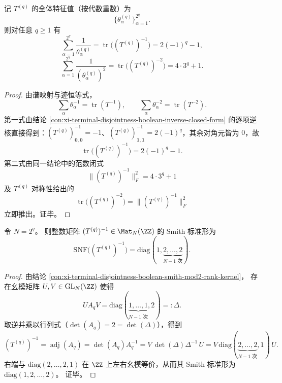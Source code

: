 \begin{conclusion}[全谱倒一阶与倒二阶矩闭式]\label{con:xi-terminal-disjointness-boolean-inverse-spectral-moments}
记 \(T^{(q)}\) 的全体特征值（按代数重数）为
\[
\{\theta_{\alpha}^{(q)}\}_{\alpha=1}^{2^q}.
\]
则对任意 \(q\ge 1\) 有
\[
\sum_{\alpha=1}^{2^q}\frac{1}{\theta_{\alpha}^{(q)}}
=\operatorname{tr}\!\bigl((T^{(q)})^{-1}\bigr)
=2(-1)^q-1,
\]
\[
\sum_{\alpha=1}^{2^q}\frac{1}{(\theta_{\alpha}^{(q)})^{2}}
=\operatorname{tr}\!\bigl((T^{(q)})^{-2}\bigr)
=4\cdot 3^q+1.
\]
\end{conclusion}
\begin{proof}
由谱映射与迹恒等式，
\[
\sum_{\alpha}\theta_{\alpha}^{-1}=\operatorname{tr}(T^{-1}),
\qquad
\sum_{\alpha}\theta_{\alpha}^{-2}=\operatorname{tr}(T^{-2}).
\]
第一式由结论 \ref{con:xi-terminal-disjointness-boolean-inverse-closed-form} 的逐项逆核直接得到：\((T^{(q)})^{-1}_{\mathbf 0,\mathbf 0}=-1\)、\((T^{(q)})^{-1}_{\mathbf 1,\mathbf 1}=2(-1)^q\)，其余对角元皆为 \(0\)，故
\[
\operatorname{tr}\!\bigl((T^{(q)})^{-1}\bigr)=2(-1)^q-1.
\]
第二式由同一结论中的范数闭式
\[
\bigl\|(T^{(q)})^{-1}\bigr\|_F^2=4\cdot 3^q+1
\]
及 \(T^{(q)}\) 对称性给出的
\[
\operatorname{tr}\!\bigl((T^{(q)})^{-2}\bigr)=\bigl\|(T^{(q)})^{-1}\bigr\|_F^2
\]
立即推出。证毕。
\end{proof}

\begin{conclusion}\label{con:xi-terminal-disjointness-boolean-inverse-smith}
令 \(N=2^q\)。
则整数矩阵 \((T^{(q)})^{-1}\in\Mat_{N}(\ZZ)\) 的 Smith 标准形为
\[
\mathrm{SNF}\!\bigl((T^{(q)})^{-1}\bigr)=\mathrm{diag}(1,\underbrace{2,\dots,2}_{N-1\text{ 次}}).
\]
\end{conclusion}
\begin{proof}
由结论 \ref{con:xi-terminal-disjointness-boolean-smith-mod2-rank-kernel}，
存在幺模矩阵 \(U,V\in\mathrm{GL}_{N}(\ZZ)\) 使得
\[
UA_qV=\mathrm{diag}(\underbrace{1,\dots,1}_{N-1\text{ 次}},2)=:\Delta.
\]
取逆并乘以行列式（\(\det(A_q)=2=\det(\Delta)\)），得到
\[
(T^{(q)})^{-1}=\operatorname{adj}(A_q)=\det(A_q)A_q^{-1}
=V\,\det(\Delta)\Delta^{-1}\,U
=V\,\mathrm{diag}(\underbrace{2,\dots,2}_{N-1\text{ 次}},1)\,U.
\]
右端与 \(\mathrm{diag}(2,\dots,2,1)\) 在 \(\ZZ\) 上左右幺模等价，从而其 Smith 标准形为
\(\mathrm{diag}(1,2,\dots,2)\)。
证毕。
\end{proof}

